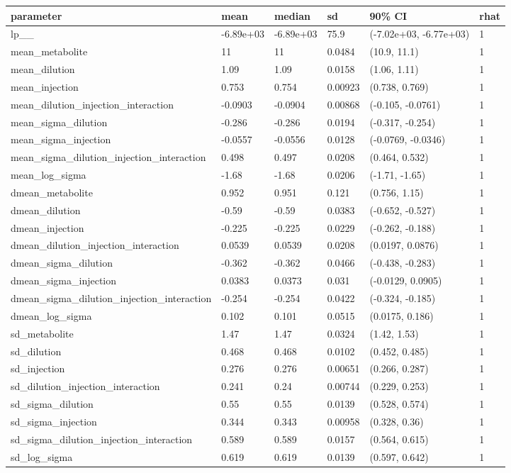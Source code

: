 
\begin{tabular}{l|l|l|l|l|l}
\hline
parameter & mean & median & sd & 90\% CI & rhat\\
\hline
lp\_\_ & -6.89e+03 & -6.89e+03 & 75.9 & (-7.02e+03, -6.77e+03) & 1\\
\hline
mean\_metabolite & 11 & 11 & 0.0484 & (10.9, 11.1) & 1\\
\hline
mean\_dilution & 1.09 & 1.09 & 0.0158 & (1.06, 1.11) & 1\\
\hline
mean\_injection & 0.753 & 0.754 & 0.00923 & (0.738, 0.769) & 1\\
\hline
mean\_dilution\_injection\_interaction & -0.0903 & -0.0904 & 0.00868 & (-0.105, -0.0761) & 1\\
\hline
mean\_sigma\_dilution & -0.286 & -0.286 & 0.0194 & (-0.317, -0.254) & 1\\
\hline
mean\_sigma\_injection & -0.0557 & -0.0556 & 0.0128 & (-0.0769, -0.0346) & 1\\
\hline
mean\_sigma\_dilution\_injection\_interaction & 0.498 & 0.497 & 0.0208 & (0.464, 0.532) & 1\\
\hline
mean\_log\_sigma & -1.68 & -1.68 & 0.0206 & (-1.71, -1.65) & 1\\
\hline
dmean\_metabolite & 0.952 & 0.951 & 0.121 & (0.756, 1.15) & 1\\
\hline
dmean\_dilution & -0.59 & -0.59 & 0.0383 & (-0.652, -0.527) & 1\\
\hline
dmean\_injection & -0.225 & -0.225 & 0.0229 & (-0.262, -0.188) & 1\\
\hline
dmean\_dilution\_injection\_interaction & 0.0539 & 0.0539 & 0.0208 & (0.0197, 0.0876) & 1\\
\hline
dmean\_sigma\_dilution & -0.362 & -0.362 & 0.0466 & (-0.438, -0.283) & 1\\
\hline
dmean\_sigma\_injection & 0.0383 & 0.0373 & 0.031 & (-0.0129, 0.0905) & 1\\
\hline
dmean\_sigma\_dilution\_injection\_interaction & -0.254 & -0.254 & 0.0422 & (-0.324, -0.185) & 1\\
\hline
dmean\_log\_sigma & 0.102 & 0.101 & 0.0515 & (0.0175, 0.186) & 1\\
\hline
sd\_metabolite & 1.47 & 1.47 & 0.0324 & (1.42, 1.53) & 1\\
\hline
sd\_dilution & 0.468 & 0.468 & 0.0102 & (0.452, 0.485) & 1\\
\hline
sd\_injection & 0.276 & 0.276 & 0.00651 & (0.266, 0.287) & 1\\
\hline
sd\_dilution\_injection\_interaction & 0.241 & 0.24 & 0.00744 & (0.229, 0.253) & 1\\
\hline
sd\_sigma\_dilution & 0.55 & 0.55 & 0.0139 & (0.528, 0.574) & 1\\
\hline
sd\_sigma\_injection & 0.344 & 0.343 & 0.00958 & (0.328, 0.36) & 1\\
\hline
sd\_sigma\_dilution\_injection\_interaction & 0.589 & 0.589 & 0.0157 & (0.564, 0.615) & 1\\
\hline
sd\_log\_sigma & 0.619 & 0.619 & 0.0139 & (0.597, 0.642) & 1\\
\hline
\end{tabular}
